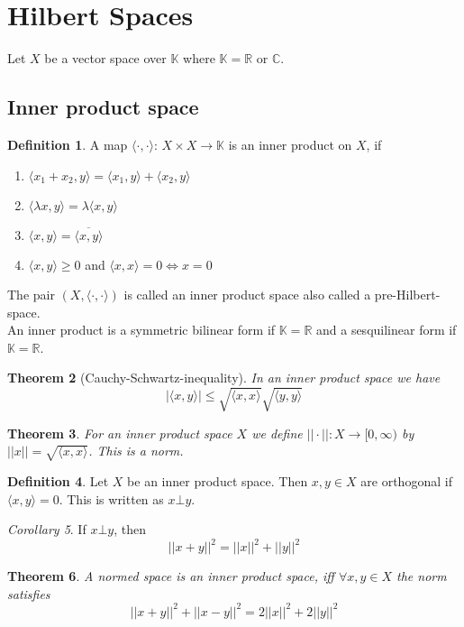 \documentclass[a4paper, 12pt]{article}
\theoremstyle{plain}
\newtheorem{theorem}{Theorem}[subsection] %
\theoremstyle{definition}
\newtheorem{definition}[theorem]{Definition} %
\theoremstyle{lemma}
\theoremstyle{remark}
\theoremstyle{corollary}
\newtheorem{corollary}[theorem]{Corollary}
\theoremstyle{example}
\begin{document}
	\section{Hilbert Spaces}
	Let $X$ be a vector space over $\mathbb{K}$ where $\mathbb{K} = \mathbb{R}$ or $\mathbb{C}$.
	\subsection{Inner product space}
	\begin{definition}
		A map $\langle \cdot , \cdot \rangle$: $X\times X \to \mathbb{K}$ is an inner product on $X$, if \begin{enumerate}
			\item $\langle x_1+x_2, y \rangle = \langle x_1,y\rangle + \langle x_2,y\rangle$
			\item $\langle \lambda x,y\rangle = \lambda \langle x,y\rangle$
			\item $\langle x,y\rangle = \overline{\langle x,y\rangle}$
			\item $\langle x,y\rangle \geq 0$ and $\langle x,x\rangle = 0 \Leftrightarrow x=0$
		\end{enumerate}
		The pair $(X, \langle\cdot,\cdot\rangle)$ is called an inner product space also called a pre-Hilbert-space.\\
		An inner product is a symmetric bilinear form if $\mathbb{K} = \mathbb{R}$ and a sesquilinear form if $\mathbb{K} = \mathbb{R}$.
	\end{definition}
	\begin{theorem} [Cauchy-Schwartz-inequality]
		In an inner product space we have \[\left|\langle x,y\rangle\right| \leq \sqrt{\langle x,x\rangle} \sqrt{\langle y,y\rangle}\]
	\end{theorem}
	\begin{theorem}
		For an inner product space $X$ we define $||\cdot ||: X \to [0,\infty)$ by $||x|| = \sqrt{\langle x,x\rangle}$. This is a norm.
	\end{theorem}
	\begin{definition}
		Let $X$ be an inner product space. Then $x,y \in X$ are orthogonal if $\langle x,y\rangle = 0$. This is written as $x\bot y$.
	\end{definition}
	\begin{corollary}
		If $x\bot y$, then \[||x+y||^2 = ||x||^2 + ||y||^2\]
	\end{corollary}
	\begin{theorem}
		A normed space is an inner product space, iff $\forall x,y \in X$ the norm satisfies  \[||x+y||^2 + ||x-y||^2 = 2||x||^2 + 2||y||^2\]
	\end{theorem}
\end{document}
